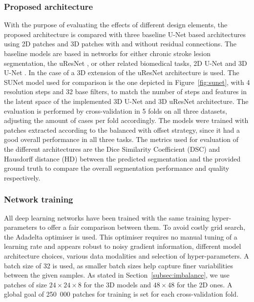 \documentclass[letterpaper,final,authoryear,3p,times,twocolumn]{elsarticle}
\begin{document}
\subsubsection{Proposed architecture}

With the purpose of evaluating the effects of different design elements, the proposed architecture is compared with three baseline U-Net based architectures using 2D patches and 3D patches with and without residual connections. The baseline models are based in networks for either chronic stroke lesion segmentation, the uResNet \citep{Guerrero2018uresnet}, or other related biomedical tasks, 2D U-Net \citep{Ronneberger2015} and 3D U-Net \citep{Cicek2016}. In the case of \cite{Guerrero2018uresnet} a 3D extension of the uResNet architecture is used. The SUNet model used for comparison is the one depicted in Figure~\ref{fig:sunet}, with 4 resolution steps and 32 base filters, to match the number of steps and features in the latent space of the implemented 3D U-Net and 3D uResNet architecture. The evaluation is performed by cross-validation in 5 folds on all three datasets, adjusting the amount of cases per fold accordingly. The models were trained with patches extracted according to the balanced with offset strategy, since it had a good overall performance in all three tasks. The metrics used for evaluation of the different architectures are the Dice Similarity Coefficient (DSC) and Hausdorff distance (HD) between the predicted
segmentation and the provided ground truth to compare the overall segmentation performance and quality respectively.

\subsubsection{Network training} \label{subsubsec:networktrain}

All deep learning networks have been trained with the same training hyper-parameters to offer a fair comparison between them. To avoid costly grid search, the Adadelta optimiser \citep{Zeiler2012} is used. This optimiser requires no manual tuning of a learning rate and appears robust to noisy gradient information, different model architecture choices, various data modalities and selection of hyper-parameters. A batch size of 32 is used, as smaller batch sizes help capture finer variabilities between the given samples. As stated in Section~\ref{subsec:imbalance}, we use patches of size $24\times24\times8$ for the 3D models and $48\times48$ for the 2D ones. A global goal of 250~000 patches for training is set for each cross-validation fold.
\end{document}
